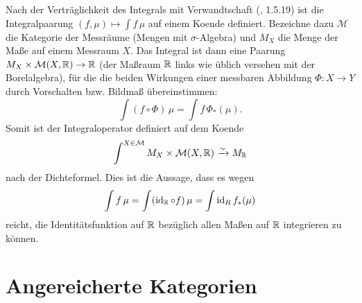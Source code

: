 \begin{bsp}
  Nach der Verträglichkeit des Integrals mit Verwandtschaft
  (\cite{AN3}, 1.5.19) ist die Integralpaarung $(f, \mu) \mapsto \int
  f \, \mu$ auf einem Koende definiert. Bezeichne dazu $\mathcal{M}$
  die Kategorie der Messräume (Mengen mit $\sigma$-Algebra) und $M_X$
  die Menge der Maße auf einem Messraum $X$. Das Integral ist dann
  eine Paarung $M_X \times \mathcal{M}(X, \mathbb{R}) \to \mathbb{R}$ (der Maßraum
  $\mathbb{R}$ links wie üblich versehen mit der Borelalgebra), für die die
  beiden Wirkungen einer messbaren Abbildung $\Phi: X \to Y$ durch
  Vorschalten bzw. Bildmaß übereinstimmen:
  \[ \int (f \circ \Phi) \, \mu = \int f \, \Phi_*(\mu). \]
  Somit ist der Integraloperator definiert auf dem Koende
  \[ \int^{X \in \mathcal{M}} M_X \times \mathcal{M}(X, \mathbb{R}) \xrightarrow[]{\sim} M_{\mathbb{R}} \]
  nach der Dichteformel. Dies ist die Aussage, dass es wegen
  \[ \int f \, \mu = \int (\operatorname{id}_{\mathbb{R}} \circ f) \, \mu = \int \operatorname{id}_R f_*(\mu) \]
  reicht, die Identitätsfunktion auf $\mathbb{R}$ bezüglich allen Maßen auf
  $\mathbb{R}$ integrieren zu können.
\end{bsp}

\section{Angereicherte Kategorien}
\label{sec:enriched}

